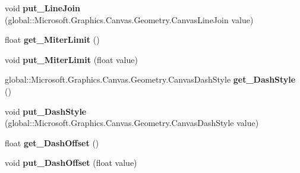 \begin{DoxyCompactItemize}
\mbox{\label{class_microsoft_1_1_graphics_1_1_canvas_1_1_geometry_1_1_canvas_stroke_style_a112f794308a583b16c6b52a845430a94}} 
void {\bfseries put\+\_\+\+Line\+Join} (global\+::\+Microsoft.\+Graphics.\+Canvas.\+Geometry.\+Canvas\+Line\+Join value)
\item 
\mbox{\label{class_microsoft_1_1_graphics_1_1_canvas_1_1_geometry_1_1_canvas_stroke_style_a999cba5c52b4a29dc17175ce7f226aec}} 
float {\bfseries get\+\_\+\+Miter\+Limit} ()
\item 
\mbox{\label{class_microsoft_1_1_graphics_1_1_canvas_1_1_geometry_1_1_canvas_stroke_style_ad0733f31456bf9ae960760a481eb54a5}} 
void {\bfseries put\+\_\+\+Miter\+Limit} (float value)
\item 
\mbox{\label{class_microsoft_1_1_graphics_1_1_canvas_1_1_geometry_1_1_canvas_stroke_style_ab7a77fa7925c62bfceb8ec4a9ffed0a2}} 
global\+::\+Microsoft.\+Graphics.\+Canvas.\+Geometry.\+Canvas\+Dash\+Style {\bfseries get\+\_\+\+Dash\+Style} ()
\item 
\mbox{\label{class_microsoft_1_1_graphics_1_1_canvas_1_1_geometry_1_1_canvas_stroke_style_a58b2ea381cdec6b425c64655ffe06924}} 
void {\bfseries put\+\_\+\+Dash\+Style} (global\+::\+Microsoft.\+Graphics.\+Canvas.\+Geometry.\+Canvas\+Dash\+Style value)
\item 
\mbox{\label{class_microsoft_1_1_graphics_1_1_canvas_1_1_geometry_1_1_canvas_stroke_style_ad6a5cdd86562a8dfdb8e856ccf7227dc}} 
float {\bfseries get\+\_\+\+Dash\+Offset} ()
\item 
\mbox{\label{class_microsoft_1_1_graphics_1_1_canvas_1_1_geometry_1_1_canvas_stroke_style_a01c2250f29f3c8b71ac14ac77e246dff}} 
void {\bfseries put\+\_\+\+Dash\+Offset} (float value)
\item 

\end{DoxyCompactItemize}
